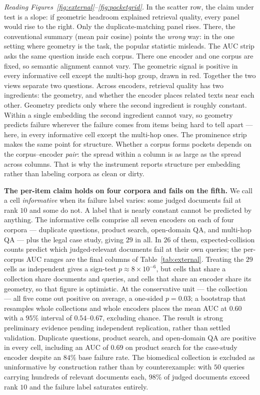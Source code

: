 \documentclass[11pt,letterpaper]{article}
\begin{document}
\emph{Reading Figures~\ref{fig:external}--\ref{fig:pocketgrid}.} In the
scatter row, the claim under test is a slope: if geometric headroom
explained retrieval quality, every panel would rise to the right. Only the
duplicate-matching panel rises. There, the conventional summary (mean pair
cosine) points the \emph{wrong} way: in the one setting where geometry is
the task, the popular statistic misleads. The AUC strip asks the same
question inside each corpus. There one encoder and one corpus are fixed,
so semantic alignment cannot vary. The geometric signal is positive in
every informative cell except the multi-hop group, drawn in red. Together
the two views separate two questions. Across encoders, retrieval quality
has two ingredients: the geometry, and whether the encoder places related
texts near each other. Geometry predicts only where the second ingredient
is roughly constant. Within a single embedding the second ingredient
cannot vary, so geometry predicts failure wherever the failure comes from
items being hard to tell apart --- here, in every informative cell except
the multi-hop ones. The prominence strip makes the same point for
structure. Whether a corpus forms pockets depends on the corpus--encoder
\emph{pair}: the spread within a column is as large as the spread across
columns. That is why the instrument reports structure per embedding rather
than labeling corpora as clean or dirty.


\textbf{The per-item claim holds on four corpora and fails on the fifth.}
We call a cell \emph{informative} when its failure label varies: some
judged documents fail at rank $10$ and some do not. A label that is nearly
constant cannot be predicted by anything. The informative cells comprise
all seven encoders on each of four corpora --- duplicate questions,
product search, open-domain QA, and multi-hop QA --- plus the legal case
study, giving $29$ in all. In $26$ of them, expected-collision counts predict which
judged-relevant documents fail at their own queries; the per-corpus AUC
ranges are the final columns of Table~\ref{tab:external}. Treating the
$29$ cells as independent gives a sign-test $p \approx 8 \times
10^{-6}$, but cells that share a collection share documents and queries,
and cells that share an encoder share its geometry, so that figure is
optimistic. At the conservative unit --- the collection --- all five
come out positive on average, a one-sided $p = 0.03$; a bootstrap that
resamples whole collections and whole encoders places the mean AUC at
$0.60$ with a $95\%$ interval of $0.54$--$0.67$, excluding chance. The
result is strong preliminary evidence pending independent replication,
rather than settled validation. Duplicate questions, product
search, and open-domain QA are positive in every cell, including an AUC of
$0.69$ on product search for the case-study encoder despite an $84\%$ base
failure rate. The biomedical collection is excluded as uninformative by
construction rather than by counterexample: with $50$ queries carrying
hundreds of relevant documents each, $98\%$ of judged documents exceed
rank $10$ and the failure label saturates entirely.
\end{document}
